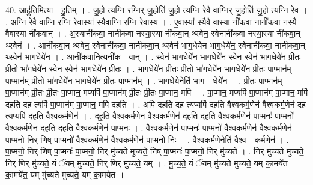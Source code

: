 \documentclass[17pt]{extarticle}
\begin{document}
40. आहु॑ति॒मित्या - हु॒ति॒म् । . जु॒हो त्य॒ग्नि र॒ग्निर् जु॒होति॑ जु॒हो त्य॒ग्नि रे॒वै वाग्निर् जु॒होति॑ जु॒हो त्य॒ग्नि रे॒व । . अ॒ग्नि रे॒वै वाग्नि र॒ग्नि रे॒वास्या᳚ स्यै॒वाग्नि र॒ग्नि रे॒वास्य॑ । . ए॒वास्या᳚ स्यै॒वै वास्या नी॑कवा॒ नानी॑कवा नस्यै॒ वैवास्या नी॑कवान् । . अ॒स्यानी॑कवा॒ नानी॑कवा नस्या॒स्या नी॑कवा॒न् थ्स्वेन॒ स्वेनानी॑कवा नस्या॒स्या नी॑कवा॒न् थ्स्वेन॑ । . आनी॑कवा॒न् थ्स्वेन॒ स्वेनानी॑कवा॒ नानी॑कवा॒न् थ्स्वेन॑ भाग॒धेये॑न भाग॒धेये॑न॒ स्वेनानी॑कवा॒ नानी॑कवा॒न् थ्स्वेन॑ भाग॒धेये॑न । . आनी॑कवा॒नित्यनी॑क - वा॒न् । . स्वेन॑ भाग॒धेये॑न भाग॒धेये॑न॒ स्वेन॒ स्वेन॑ भाग॒धेये॑न प्री॒तः प्री॒तो भा॑ग॒धेये॑न॒ स्वेन॒ स्वेन॑ भाग॒धेये॑न प्री॒तः । . भा॒ग॒धेये॑न प्री॒तः प्री॒तो भा॑ग॒धेये॑न भाग॒धेये॑न प्री॒तः पा॒प्मान॑म् पा॒प्मान॑म् प्री॒तो भा॑ग॒धेये॑न भाग॒धेये॑न प्री॒तः पा॒प्मान᳚म् । . भा॒ग॒धेये॒नेति॑ भाग - धेये॑न । . प्री॒तः पा॒प्मान॑म् पा॒प्मान॑म् प्री॒तः प्री॒तः पा॒प्मान॒ मप्यपि॑ पा॒प्मान॑म् प्री॒तः प्री॒तः पा॒प्मान॒ मपि॑ । . पा॒प्मान॒ मप्यपि॑ पा॒प्मान॑म् पा॒प्मान॒ मपि॑ दहति दह॒ त्यपि॑ पा॒प्मान॑म् पा॒प्मान॒ मपि॑ दहति । . अपि॑ दहति दह॒ त्यप्यपि॑ दहति वैश्वकर्म॒णेन॑ वैश्वकर्म॒णेन॑ दह॒ त्यप्यपि॑ दहति वैश्वकर्म॒णेन॑ । . द॒ह॒ति॒ वै॒श्व॒क॒र्म॒णेन॑ वैश्वकर्म॒णेन॑ दहति दहति वैश्वकर्म॒णेन॑ पा॒प्मनः॑ पा॒प्मनो॑ वैश्वकर्म॒णेन॑ दहति दहति वैश्वकर्म॒णेन॑ पा॒प्मनः॑ । . वै॒श्व॒क॒र्म॒णेन॑ पा॒प्मनः॑ पा॒प्मनो॑ वैश्वकर्म॒णेन॑ वैश्वकर्म॒णेन॑ पा॒प्मनो॒ निर् णिष् पा॒प्मनो॑ वैश्वकर्म॒णेन॑ वैश्वकर्म॒णेन॑ पा॒प्मनो॒ निः । . वै॒श्व॒क॒र्म॒णेनेति॑ वैश्व - क॒र्म॒णेन॑ । . पा॒प्मनो॒ निर् णिष् पा॒प्मनः॑ पा॒प्मनो॒ निर् मु॑च्यते मुच्यते॒ निष् पा॒प्मनः॑ पा॒प्मनो॒ निर् मु॑च्यते । . निर् मु॑च्यते मुच्यते॒ निर् णिर् मु॑च्यते॒ यं ॅयम् मु॑च्यते॒ निर् णिर् मु॑च्यते॒ यम् । . मु॒च्य॒ते॒ यं ॅयम् मु॑च्यते मुच्यते॒ यम् का॒मये॑त का॒मये॑त॒ यम् मु॑च्यते मुच्यते॒ यम् का॒मये॑त । \newline
\end{document}
